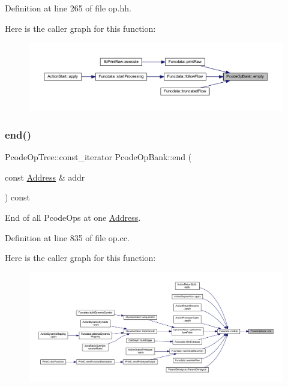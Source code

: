 Definition at line 265 of file op.\+hh.

Here is the caller graph for this function\+:
\nopagebreak
\begin{figure}[H]
\begin{center}
\leavevmode
\includegraphics[width=350pt]{class_pcode_op_bank_aefe81f2a41de865f29c46270e8375236_icgraph}
\end{center}
\end{figure}
\mbox{\label{class_pcode_op_bank_a5275bd8fcaaed9b6c3f00a3301a63d52}} 
\subsubsection{\texorpdfstring{end()}{end()}\hspace{0.1cm}{\footnotesize\ttfamily [1/2]}}
{\footnotesize\ttfamily Pcode\+Op\+Tree\+::const\+\_\+iterator Pcode\+Op\+Bank\+::end (\begin{DoxyParamCaption}\item[{const \mbox{\hyperlink{class_address}{Address}} \&}]{addr }\end{DoxyParamCaption}) const}



End of all Pcode\+Ops at one \mbox{\hyperlink{class_address}{Address}}. 



Definition at line 835 of file op.\+cc.

Here is the caller graph for this function\+:
\nopagebreak
\begin{figure}[H]
\begin{center}
\leavevmode
\includegraphics[width=350pt]{class_pcode_op_bank_a5275bd8fcaaed9b6c3f00a3301a63d52_icgraph}
\end{center}
\end{figure}
\mbox{\label{class_pcode_op_bank_a25064445ec0c3929d233a86515e7b058}} 
